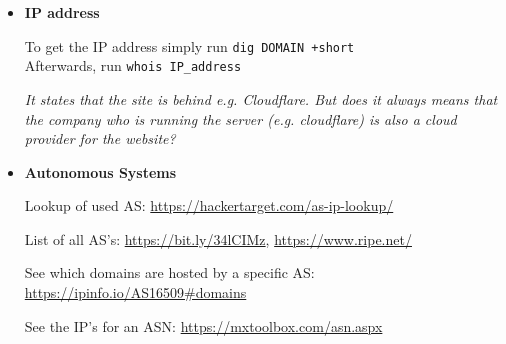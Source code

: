 \documentclass[12pt]{article}
\begin{document}
\begin{itemize}
    
    \item \textbf{IP address}
    
    To get the IP address simply run \verb|dig DOMAIN +short| \\
    Afterwards, run \verb|whois IP_address| 
    
    \textit{It states that the site is behind e.g. Cloudflare. But does it always means that the company who is running the server (e.g. cloudflare) is also a cloud provider for the website?}
    
    
    \item \textbf{Autonomous Systems}
    
    Lookup of used AS: \url{https://hackertarget.com/as-ip-lookup/}
    
    List of all AS's: \url{https://bit.ly/34lCIMz}, \url{https://www.ripe.net/}
    
    See which domains are hosted by a specific AS: \url{https://ipinfo.io/AS16509#domains}
        
    See the IP's for an ASN: \url{https://mxtoolbox.com/asn.aspx}
    

\end{itemize}
\end{document}
